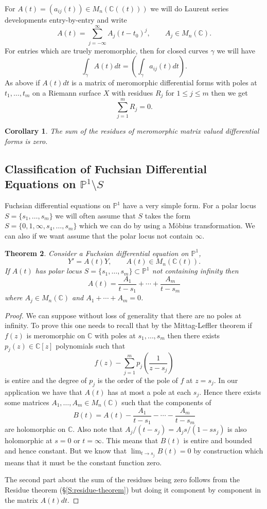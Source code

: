 \documentclass[12pt]{book}
\numberwithin{equation}{section}
\newtheorem{theorem}{Theorem}[subsection]
\newtheorem{corollary}[theorem]{Corollary}
\theoremstyle{definition}
\theoremstyle{remark}
\newcommand{\CC}{\mathbb{C}}
\newcommand{\PP}{\mathbb{P}}
\begin{document}
For $A(t) = (a_{ij}(t)) \in M_n(\CC((t)))$ we will do Laurent series developments entry-by-entry and write 
$$ A(t) = \sum_{j=-\infty}^{\infty} A_j (t-t_0)^j, \qquad A_j \in M_n(\CC).$$
For entries which are truely meromorphic, then for closed curves $\gamma$ we will have  
$$\int_{\gamma} A(t)dt = (\int_{\gamma}a_{ij}(t)dt).$$ 
As above if $A(t)dt$ is a matrix of meromorphic differential forms with poles at $t_1,\ldots,t_m$ on a Riemann surface $X$ with residues $R_j$ for $1\leq j \leq m$ then we get
$$ \sum_{j=1}^m R_j =0.$$

\begin{corollary}
	The sum of the residues of meromorphic matrix valued differential forms is zero.
\end{corollary}

\subsection{Classification of Fuchsian Differential Equations on $\PP^1 \setminus S$}
Fuchsian differential equations on $\PP^1$ have a very simple form.
For a polar locus $S = \lbrace s_1,\ldots,s_m\rbrace$ we will often assume that $S$ takes the form $S =\lbrace 0,1,\infty,s_4,\ldots,s_m \rbrace$ which we can do by using a M\"{o}bius transformation. 
We can also if we want assume that the polar locus not contain $\infty$. 
\begin{theorem}
	Consider a Fuchsian differential equation on $\PP^1$,
	$$ Y' = A(t) Y, \qquad A(t) \in M_n(\CC(t)).$$
	If $A(t)$ has polar locus $S=\lbrace s_1,\ldots,s_m\rbrace \subset \PP^1$ not containing infinity then 
	$$ A(t) = \frac{A_1}{t-s_1} + \cdots + \frac{A_m}{t-s_m} $$
	where $A_j \in M_n(\CC)$ and $A_1+\cdots + A_m=0$.
\end{theorem}
\begin{proof}
	We can suppose without loss of generality that there are no poles at infinity. 
	To prove this one needs to recall that by the Mittag-Leffler theorem \cite[Proposition 2.19]{Schlag2014 } if $f(z)$ is meromorphic on $\CC$ with poles at $s_1,\ldots,s_m$ then there exists $p_j(z) \in \CC[z]$ polynomials such that 
	$$ f(z) - \sum_{j=1}^m p_j( \frac{1}{z-s_j}) $$
	is entire and the degree of $p_j$ is the order of the pole of $f$ at $z=s_j$.
	In our application we have that $A(t)$ has at most a pole at each $s_j$. 
	Hence there exists some matrices $A_1,\ldots, A_m \in M_n(\CC)$ such that the components of  
	$$B(t) = A(t) - \frac{A_1}{t-s_1} - \cdots - \frac{A_m}{t-s_m} $$
	are holomorphic on $\CC$. 
	Also note that $A_j/(t-s_j) = A_js/(1-ss_j)$ is also holomorphic at $s=0$ or $t=\infty$. 
	This means that $B(t)$ is entire and bounded and hence constant. 
	But we know that $\lim_{t\to s_j}B(t) =0$ by construction which means that it must be the constant function zero. 
	
	The second part about the sum of the residues being zero follows from the Residue theorem (\S \ref{S:residue-theorem}) but doing it component by component in the matrix $A(t)dt$.
\end{proof}
\end{document}
